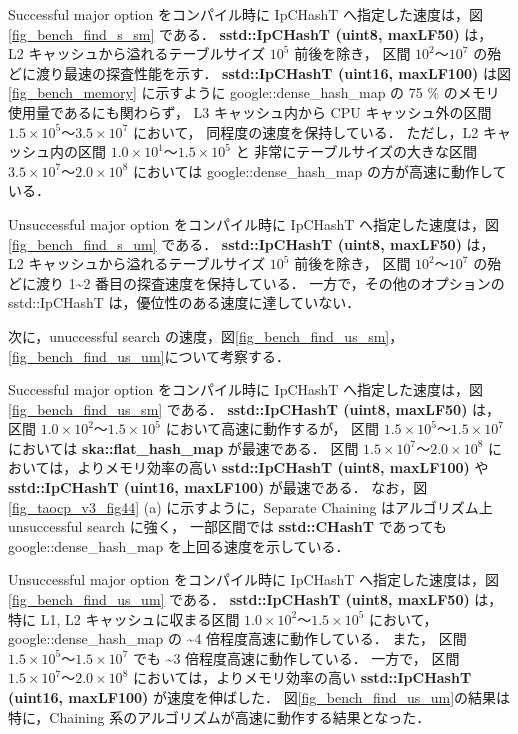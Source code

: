 Successful major option をコンパイル時に IpCHashT へ指定した速度は，図\ref{fig_bench_find_s_sm} である．
{\bf sstd::IpCHashT (uint8, maxLF50)} は，
L2 キャッシュから溢れるテーブルサイズ $10^5$ 前後を除き，
区間 $10^2〜10^7$ の殆どに渡り最速の探査性能を示す．
{\bf sstd::IpCHashT (uint16, maxLF100)} は図\ref{fig_bench_memory} に示すように
google::dense\_hash\_map の 75 \% のメモリ使用量であるにも関わらず，
L3 キャッシュ内から CPU キャッシュ外の区間 $1.5\times10^5〜3.5\times10^7$ において，
同程度の速度を保持している．
ただし，L2 キャッシュ内の区間 $1.0\times10^1〜1.5\times10^5$ と
非常にテーブルサイズの大きな区間 $3.5\times10^7〜2.0\times10^8$ においては
google::dense\_hash\_map の方が高速に動作している．

Unsuccessful major option をコンパイル時に IpCHashT へ指定した速度は，図\ref{fig_bench_find_s_um} である．
{\bf sstd::IpCHashT (uint8, maxLF50)} は，
L2 キャッシュから溢れるテーブルサイズ $10^5$ 前後を除き，
区間 $10^2〜10^7$ の殆どに渡り 1\textasciitilde 2 番目の探査速度を保持している．
一方で，その他のオプションの sstd::IpCHashT は，優位性のある速度に達していない．

次に，unuccessful search の速度，図\ref{fig_bench_find_us_sm}，\ref{fig_bench_find_us_um}について考察する．

Successful major option をコンパイル時に IpCHashT へ指定した速度は，図\ref{fig_bench_find_us_sm} である．
{\bf sstd::IpCHashT (uint8, maxLF50)} は，
区間 $1.0\times10^2〜1.5\times10^5$ において高速に動作するが，
区間 $1.5\times10^5〜1.5\times10^7$ においては {\bf ska::flat\_hash\_map} が最速である．
区間 $1.5\times10^7〜2.0\times10^8$ においては，よりメモリ効率の高い
{\bf sstd::IpCHashT (uint8, maxLF100)} や {\bf sstd::IpCHashT (uint16, maxLF100)} が最速である．
なお，図\ref{fig_taocp_v3_fig44} (a) に示すように，Separate Chaining はアルゴリズム上 unsuccessful search に強く，
一部区間では {\bf sstd::CHashT} であっても google::dense\_hash\_map を上回る速度を示している．

Unsuccessful major option をコンパイル時に IpCHashT へ指定した速度は，図\ref{fig_bench_find_us_um} である．
{\bf sstd::IpCHashT (uint8, maxLF50)} は，
特に L1, L2 キャッシュに収まる区間 $1.0\times10^2〜1.5\times10^5$ において，
google::dense\_hash\_map の \textasciitilde4 倍程度高速に動作している．
また，
区間 $1.5\times10^5〜1.5\times10^7$ でも \textasciitilde3 倍程度高速に動作している．
一方で，
区間 $1.5\times10^7〜2.0\times10^8$ においては，よりメモリ効率の高い {\bf sstd::IpCHashT (uint16, maxLF100)} が速度を伸ばした．
図\ref{fig_bench_find_us_um}の結果は特に，Chaining 系のアルゴリズムが高速に動作する結果となった．
\leavevmode \newline

